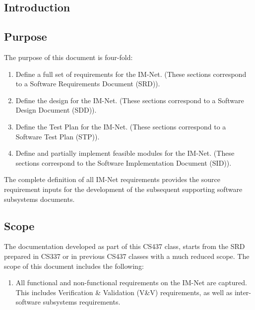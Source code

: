 \documentclass[letterpaper]{article}
\begin{document}
\tableofcontents
\listoffigures

\eject

{\textcolor{section}{\section{Introduction}}

\textcolor{subsection}{\subsection{Purpose}}

The purpose of this document is four-fold:

\begin{enumerate}
\item  Define a full set of requirements for the IM-Net. (These sections correspond to a Software Requirements Document (SRD)).

\item  Define the design for the IM-Net. (These sections correspond to a Software Design Document (SDD)).

\item  Define the Test Plan for the IM-Net. (These sections correspond to a Software Test Plan (STP)).

\item  Define and partially implement feasible modules for the IM-Net.  (These sections correspond to the Software Implementation Document (SID)).
\end{enumerate}

The complete definition of all IM-Net requirements provides the source requirement inputs for the development of the subsequent supporting software subsystems documents.

\textcolor{subsection}{\subsection{Scope}}

The documentation developed as part of this CS437 class, starts from the SRD prepared in CS337 or in previous CS437 classes with a much reduced scope.  The scope of this document includes the following:

\begin{enumerate}
\item  All functional and non-functional requirements on the IM-Net are captured.  This includes Verification \& Validation (V\&V) requirements, as well as inter-software subsystems requirements.


\end{enumerate}}
\end{document}
